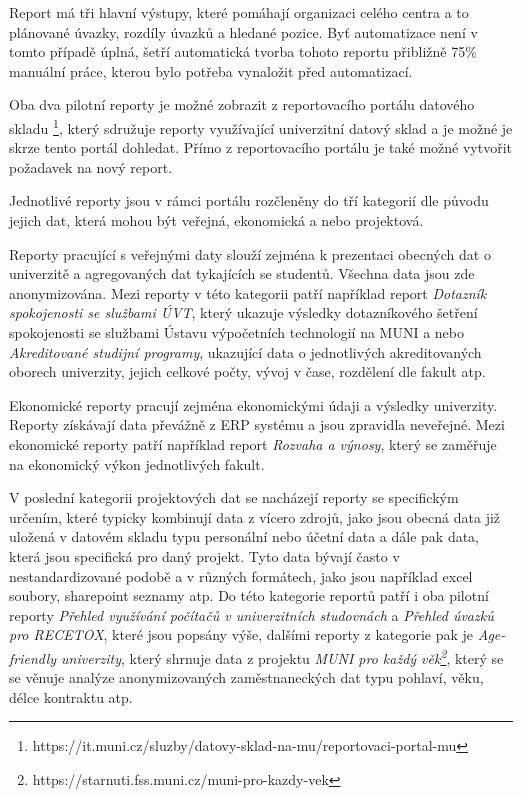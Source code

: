 \documentclass[
  digital,     %
  twoside,     %
  lof,         %
  lot,         %
]{fithesis4}
\begin{document}
Report má tři hlavní výstupy, které pomáhají organizaci celého centra a to plánované úvazky, rozdíly úvazků a hledané pozice. Byť automatizace není v tomto případě úplná, šetří automatická tvorba tohoto reportu přibližně 75\% manuální práce, kterou bylo potřeba vynaložit před automatizací.

Oba dva pilotní reporty je možné zobrazit z reportovacího portálu datového skladu \footnote{https://it.muni.cz/sluzby/datovy-sklad-na-mu/reportovaci-portal-mu}, který sdružuje reporty využívající univerzitní datový sklad a je možné je skrze tento portál dohledat. Přímo z reportovacího portálu je také možné vytvořit požadavek na nový report.

Jednotlivé reporty jsou v rámci portálu rozčleněny do tří kategorií dle původu jejich dat, která mohou být veřejná, ekonomická a nebo projektová. 

Reporty pracující s veřejnými daty slouží zejména k prezentaci obecných dat o univerzitě a agregovaných dat tykajících se studentů. Všechna data jsou zde anonymizována. Mezi reporty v této kategorii patří například report \emph{Dotazník spokojenosti se službami ÚVT}, který ukazuje výsledky dotazníkového šetření spokojenosti se službami Ústavu výpočetních technologií na MUNI a nebo \emph{Akreditované studijní programy}, ukazující data o jednotlivých akreditovaných oborech univerzity, jejich celkové počty, vývoj v čase, rozdělení dle fakult atp.

Ekonomické reporty pracují zejména ekonomickými údaji a výsledky univerzity. Reporty získávají data převážně z ERP systému a jsou zpravidla neveřejné. Mezi ekonomické reporty patří například report \emph{Rozvaha a výnosy}, který se zaměřuje na ekonomický výkon jednotlivých fakult.

V poslední kategorii projektových dat se nacházejí reporty se specifickým určením, které typicky kombinují data z vícero zdrojů, jako jsou obecná data již uložená v datovém skladu typu personální nebo účetní data a dále pak data, která jsou specifická pro daný projekt. Tyto data bývají často v nestandardizované podobě a v různých formátech, jako jsou například excel soubory, sharepoint seznamy atp. Do této kategorie reportů patří i oba pilotní reporty \emph{Přehled využívání počítačů v univerzitních studovnách} a \emph{Přehled úvazků pro RECETOX}, které jsou popsány výše, dalšími reporty z kategorie pak je \emph{Age-friendly univerzity}, který shrnuje data z projektu \emph{MUNI pro každý věk\footnote{https://starnuti.fss.muni.cz/muni-pro-kazdy-vek}}, který se se věnuje analýze anonymizovaných zaměstnaneckých dat typu pohlaví, věku, délce kontraktu atp.
\end{document}
